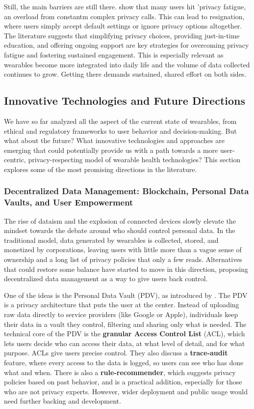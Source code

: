 	Still, the main barriers are still there. \cite{Choi2018} show that many users hit 'privacy fatigue, an overload from constantm complex privacy calls. This can lead to resignation, where users simply accept default settings or ignore privacy options altogether. The literature suggests that simplifying privacy choices, providing just-in-time education, and offering ongoing support are key strategies for overcoming privacy fatigue and fostering sustained engagement. This is especially relevant as wearables become more integrated into daily life and the volume of data collected continues to grow. Getting there demands sustained, shared effort on both sides.
\subsection{Innovative Technologies and Future Directions}
We have so far analyzed all the aspect of the current state of wearables, from ethical and regulatory frameworks to user behavior and decision-making. But what about the future? What innovative technologies and approaches are emerging that could potentially provide us with a path towards a more user-centric, privacy-respecting model of wearable health technologies? This section explores some of the most promising directions in the literature.
	\subsubsection{Decentralized Data Management: Blockchain, Personal Data Vaults, and User Empowerment}

	The rise of dataism and the explosion of connected devices slowly elevate the mindset towards the debate around who should control personal data. In the traditional model, data generated by wearables is collected, stored, and monetized by corporations, leaving users with little more than a vague sense of ownership and a long list of privacy policies that only a few reads. Alternatives that could restore some balance have started to move in this direction, proposing decentralized data management as a way to give users back control.

	One of the ideas is the Personal Data Vault (PDV), as introduced by \cite{Mun2010}. The PDV is a privacy architecture that puts the user at the center. Instead of uploading raw data directly to service providers (like Google or Apple), individuals keep their data in a vault they control, filtering and sharing only what is needed. The technical core of the PDV is the \textbf{granular Access Control List} (ACL), which lets users decide who can access their data, at what level of detail, and for what purpose. ACLs give users precise control. They also discuss a \textbf{trace-audit} feature, where every access to the data is logged, so users can see who has done what and when. There is also a \textbf{rule-recommender}, which suggests privacy policies based on past behavior, and is a practical addition, especially for those who are not privacy experts. However, wider deployment and public usage would need further backing and development.

